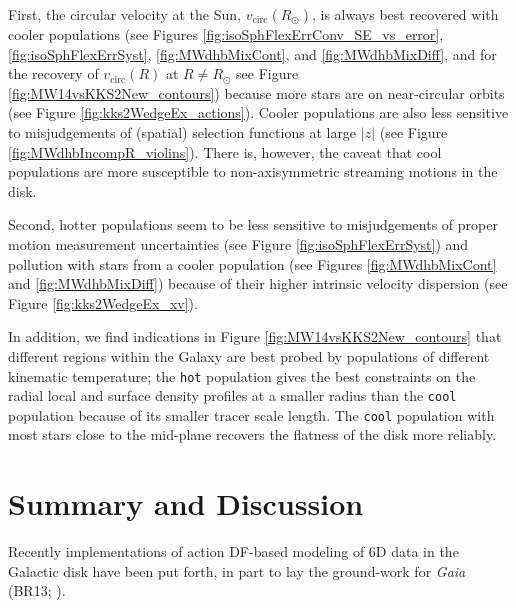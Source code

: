 \documentclass[iop,revtex4,numberedappendix,appendixfloats]{emulateapj}
\begin{document}
First, the circular velocity at the Sun, $v_\text{circ}(R_\odot)$, is always best recovered with cooler populations (see Figures \ref{fig:isoSphFlexErrConv_SE_vs_error}, \ref{fig:isoSphFlexErrSyst}, \ref{fig:MWdhbMixCont}, and \ref{fig:MWdhbMixDiff}, and for the recovery of $v_\text{circ}(R)$ at $R \neq R_\odot$ see Figure \ref{fig:MW14vsKKS2New_contours}) because more stars are on near-circular orbits (see Figure \ref{fig:kks2WedgeEx_actions}). Cooler populations are also less sensitive to misjudgements of (spatial) selection functions at large $|z|$ (see Figure \ref{fig:MWdhbIncompR_violins}). There is, however, the caveat that cool populations are more susceptible to non-axisymmetric streaming motions in the disk.

Second, hotter populations seem to be less sensitive to misjudgements of proper motion measurement uncertainties (see Figure \ref{fig:isoSphFlexErrSyst}) and pollution with stars from a cooler population (see Figures \ref{fig:MWdhbMixCont} and \ref{fig:MWdhbMixDiff}) because of their higher intrinsic velocity dispersion (see Figure \ref{fig:kks2WedgeEx_xv}).

In addition, we find indications in Figure \ref{fig:MW14vsKKS2New_contours} that different regions within the Galaxy are best probed by populations of different kinematic temperature; the \texttt{hot} population gives the best constraints on the radial local and surface density profiles at a smaller radius than the \texttt{cool} population because of its smaller tracer scale length. The \texttt{cool} population with most stars close to the mid-plane recovers the flatness of the disk more reliably.

\section{Summary and Discussion} \label{sec:discussionsummary}

Recently implementations of action DF-based modeling of 6D data in the Galactic disk have been put forth, in part to lay the ground-work for \emph{Gaia} (BR13; \citealt{2013MNRAS.433.1411M,2014MNRAS.445.3133P,2015MNRAS.449.3479S}).
\end{document}
